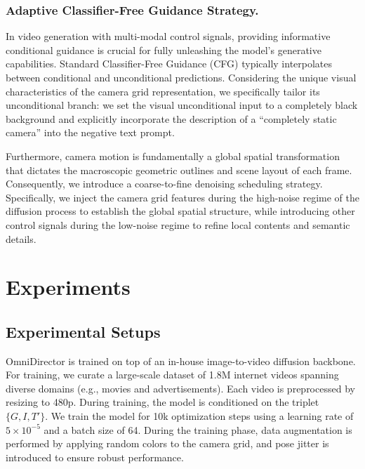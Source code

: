 \documentclass[letterpaper]{article} %
\begin{document}

\subsubsection{Adaptive Classifier-Free Guidance Strategy.}
In video generation with multi-modal control signals, providing informative conditional guidance is crucial for fully unleashing the model's generative capabilities. Standard Classifier-Free Guidance (CFG) typically interpolates between conditional and unconditional predictions. Considering the unique visual characteristics of the camera grid representation, we specifically tailor its unconditional branch: we set the visual unconditional input to a completely black background and explicitly incorporate the description of a ``completely static camera'' into the negative text prompt. 

Furthermore, camera motion is fundamentally a global spatial transformation that dictates the macroscopic geometric outlines and scene layout of each frame. Consequently, we introduce a coarse-to-fine denoising scheduling strategy. Specifically, we inject the camera grid features during the high-noise regime of the diffusion process to establish the global spatial structure, while introducing other control signals during the low-noise regime to refine local contents and semantic details.


\section{Experiments}
\subsection{Experimental Setups}
OmniDirector is trained on top of an in-house image-to-video diffusion backbone. For training, we curate a large-scale dataset of 1.8M internet videos spanning diverse domains (e.g., movies and advertisements). Each video is preprocessed by resizing to 480p. During training, the model is conditioned on the triplet $\{G, I, T'\}$. We train the model for 10k optimization steps using a learning rate of $5\times 10^{-5}$ and a batch size of 64. During the training phase, data augmentation is performed by applying random colors to the camera grid, and pose jitter is introduced to ensure robust performance.
\end{document}

